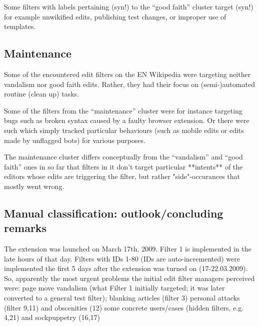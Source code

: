 Some filters with labels pertaining (syn!) to the ``good faith'' cluster target (syn!) for example unwikified edits, publishing test changes, or improper use of templates.

\subsection{Maintenance}

Some of the encountered edit filters on the EN Wikipedia were targeting neither vandalism nor good faith edits.
Rather, they had their focus on (semi-)automated routine (clean up) tasks.

Some of the filters from the ``maintenance'' cluster were for instance targeting bugs such as broken syntax caused by a faulty browser extension.
Or there were such which simply tracked particular behaviours (such as mobile edits or edits made by unflagged bots) for various purposes.

The maintenance cluster differs conceptually from the ``vandalism'' and ``good faith'' ones in so far that filters in it don't target particular **intents** of the editors whose edits are triggering the filter, but rather "side"-occurances that mostly went wrong.


\subsection{Manual classification: outlook/concluding remarks}
The extension was launched on March 17th, 2009.
Filter 1 is implemented in the late hours of that day.
Filters with IDs 1-80 (IDs are auto-incremented) were implemented the first 5 days after the extension was turned on (17-22.03.2009).
So, apparently the most urgent problems the initial edit filter managers perceived were:
page move vandalism (what Filter 1 initially targeted; it was later converted to a general test filter);
blanking articles (filter 3)
personal attacks (filter 9,11) and obscenities (12)
some concrete users/cases (hidden filters, e.g. 4,21) and sockpuppetry (16,17)

